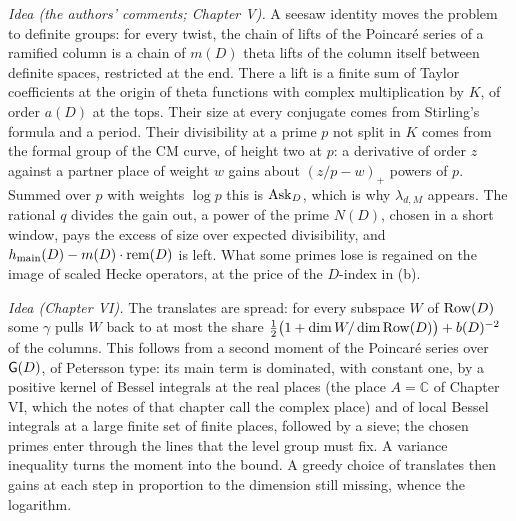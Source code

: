 \emph{Idea (the authors' comments; Chapter V).} A seesaw identity moves the problem to definite groups: for every
twist, the chain of lifts of the Poincaré series of a ramified column is a chain of $m(D)$ theta lifts
of the column itself between definite spaces, restricted at the end. There a lift is a finite sum of Taylor
coefficients at the origin of theta functions with complex multiplication by $K$, of order $a(D)$ at the tops. Their
size at every conjugate comes from Stirling's formula and a period. Their divisibility at a prime $p$ not split in $K$
comes from the formal group of the CM curve, of height two at $p$: a derivative of order $z$ against a partner place of
weight $w$ gains about $(z/p-w)_+$ powers of $p$. Summed over $p$ with weights $\log p$ this is $\mathrm{Ask}_D$, which is why
$\lambda_{d,M}$ appears. The rational $q$ divides the gain out, a power of the prime $N(D)$, chosen in a short window,
pays the excess of size over expected divisibility, and $h_{\mathrm{main}}(D)-m(D)\cdot\mathrm{rem}(D)$ is left. What
some primes lose is regained on the image of scaled Hecke operators, at the price of the $D$-index in (b).


\emph{Idea (Chapter VI).} The translates are spread: for every subspace $W$ of $\mathrm{Row}(D)$ some $\gamma$ pulls $W$ back
to at most the share $\tfrac12\bigl(1+\dim W/\dim\mathrm{Row}(D)\bigr)+b(D)^{-2}$ of the columns. This follows from a second
moment of the Poincaré series over $\mathsf{G}(D)$, of Petersson type: its main term is dominated, with constant one, by a
positive kernel of Bessel integrals at the real places (the place $A=\mathbb{C}$ of Chapter VI, which the notes of that
chapter call the complex place) and of local Bessel integrals at a large finite set of finite places, followed by a
sieve; the chosen primes enter through the lines that the level group must fix. A variance inequality turns the moment
into the bound. A greedy choice of
translates then gains at each step in proportion to the dimension still missing, whence the logarithm.

